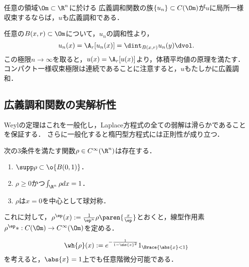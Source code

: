 \documentclass[uplatex,dvipdfmx]{jsreport}
\begin{document}
\begin{corollary}\label{cor-Harnack-L-infty-stability}
    任意の領域$\Om\subset\R^n$に於ける
    広義調和関数の族$\{u_n\}\subset C(\Om)$が$u$に局所一様収束するならば，$u$も広義調和である．
\end{corollary}
\begin{Proof}
    任意の$B(x,r)\subset\Om$について，$u_n$の調和性より，
    \[u_n(x)=\A_r[u_n(x)]=\dint_{B(x,r)}u_n(y)\dvol.\]
    この極限$n\to\infty$を取ると，$u(x)=\A_r[u(x)]$より，体積平均値の原理を満たす．
    コンパクト一様収束極限は連続であることに注意すると，$u$もたしかに広義調和．
\end{Proof}

\subsection{広義調和関数の実解析性}

\begin{tcolorbox}[colframe=ForestGreen, colback=ForestGreen!10!white,breakable,colbacktitle=ForestGreen!40!white,coltitle=black,fonttitle=\bfseries\sffamily,
title=]
    Weylの定理はこれを一般化し，Laplace方程式の全ての弱解は滑らかであることを保証する．
    さらに一般化すると楕円型方程式には正則性が成り立つ．
\end{tcolorbox}

\begin{lemma}[軟化子の性質]
    次の3条件を満たす関数$\rho\in C^\infty(\R^n)$は存在する．
    \begin{enumerate}
        \item $\supp\rho\subset\o{B(0,1)}$．
        \item $\rho\ge0$かつ$\int_{\R^n}\rho dx=1$．
        \item $\rho$は$x=0$を中心として球対称．
    \end{enumerate}
    これに対して，$\rho^\ep(x):=\frac{1}{\ep^n}\rho\paren{\frac{x}{\ep}}$とおくと，線型作用素$\rho^\ep*:C(\Om)\to C^\infty(\Om)$を定める．
\end{lemma}
\begin{Proof}
    \[\wh{\rho}(x):=e^{-\frac{1}{1-\abs{x}^2}}1_{\Brace{\abs{x}<1}}\]
    を考えると，$\abs{x}=1$上でも任意階微分可能である．
\end{Proof}
\end{document}
